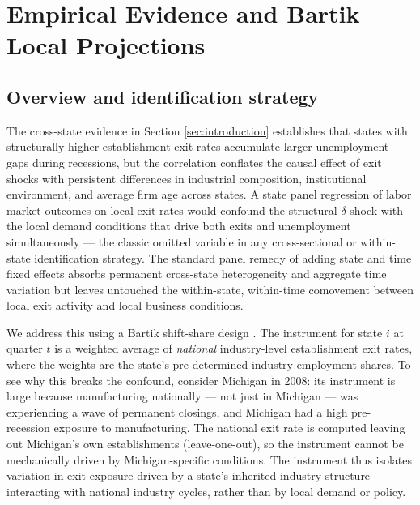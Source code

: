 \documentclass[authoryear, review, 12pt]{elsarticle}
\begin{document}
	

	\section{Empirical Evidence and Bartik Local Projections}\label{sec:empirical}

	\subsection{Overview and identification strategy}\label{sec:empirical_overview}

	The cross-state evidence in Section \ref{sec:introduction} establishes
	that states with structurally higher establishment exit rates accumulate
	larger unemployment gaps during recessions, but the correlation conflates
	the causal effect of exit shocks with persistent differences in industrial
	composition, institutional environment, and average firm age across
	states.  A state panel regression of labor market outcomes on local exit
	rates would confound the structural $\delta$ shock with the local demand
	conditions that drive both exits and unemployment simultaneously --- the
	classic omitted variable in any cross-sectional or within-state
	identification strategy.  The standard panel remedy of adding state and
	time fixed effects absorbs permanent cross-state heterogeneity and
	aggregate time variation but leaves untouched the within-state,
	within-time comovement between local exit activity and local business
	conditions.

	We address this using a Bartik shift-share design
	\citep{bartik_1991,goldsmith_2020}.  The instrument for state $i$ at
	quarter $t$ is a weighted average of \emph{national} industry-level
	establishment exit rates, where the weights are the state's
	pre-determined industry employment shares.  To see why this breaks the
	confound, consider Michigan in 2008: its instrument is large because
	manufacturing nationally --- not just in Michigan --- was experiencing
	a wave of permanent closings, and Michigan had a high pre-recession
	exposure to manufacturing.  The national exit rate is computed leaving
	out Michigan's own establishments (leave-one-out), so the instrument
	cannot be mechanically driven by Michigan-specific conditions.  The
	instrument thus isolates variation in exit exposure driven by a
	state's inherited industry structure interacting with national industry
	cycles, rather than by local demand or policy.
\end{document}
